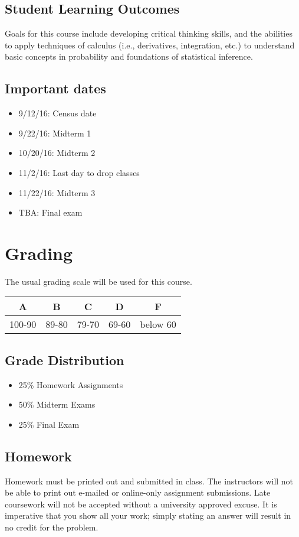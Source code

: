 \documentclass[10pt]{article}
\begin{document}
\subsection*{Student Learning Outcomes}
\label{sec:orgheadline2}
Goals for this course include developing critical thinking skills, and the abilities to apply techniques of calculus (i.e., derivatives, integration, etc.) to understand basic concepts in probability and foundations of statistical inference.
\subsection*{Important dates}
\label{sec:orgheadline3}
\begin{itemize}
\item 9/12/16: Census date
\item 9/22/16: Midterm 1
\item 10/20/16: Midterm 2
\item 11/2/16: Last day to drop classes
\item 11/22/16: Midterm 3
\item TBA: Final exam
\end{itemize}
\section*{Grading}
\label{sec:orgheadline8}
The usual grading scale will be used for this course.
\begin{table}[htb]
\centering
\begin{tabular}{ccccc}
A & B & C & D & F\\
\hline
100-90 & 89-80 & 79-70 & 69-60 & below 60\\
\end{tabular}
\end{table}

\subsection*{Grade Distribution}
\label{sec:orgheadline5}
\begin{itemize}
\item 25\% Homework Assignments
\item 50\% Midterm Exams
\item 25\% Final Exam
\end{itemize}
\subsection*{Homework}
\label{sec:orgheadline6}
Homework must be printed out and submitted in class. The instructors will not be
able to print out e-mailed or online-only assignment submissions. Late coursework will not be accepted without a university approved excuse.
It is imperative that you show all your work; simply stating an answer will result in no credit for the problem. 
\end{document}
